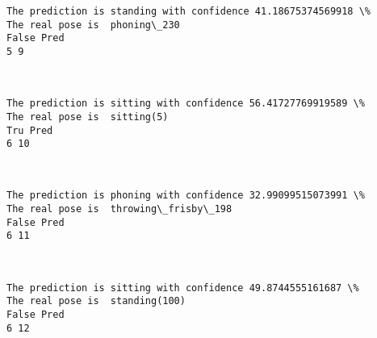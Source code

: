 \documentclass[11pt]{article}
\begin{document}
    \begin{Verbatim}[commandchars=\\\{\}]
The prediction is standing with confidence 41.18675374569918 \%
The real pose is  phoning\_230
False Pred
5 9

    \end{Verbatim}

    \begin{center}
    \end{center}
    { \hspace*{\fill} \\}
    
    \begin{Verbatim}[commandchars=\\\{\}]
The prediction is sitting with confidence 56.41727769919589 \%
The real pose is  sitting(5)
Tru Pred
6 10

    \end{Verbatim}

    \begin{center}
    \end{center}
    { \hspace*{\fill} \\}
    
    \begin{Verbatim}[commandchars=\\\{\}]
The prediction is phoning with confidence 32.99099515073991 \%
The real pose is  throwing\_frisby\_198
False Pred
6 11

    \end{Verbatim}

    \begin{center}
    \end{center}
    { \hspace*{\fill} \\}
    
    \begin{Verbatim}[commandchars=\\\{\}]
The prediction is sitting with confidence 49.8744555161687 \%
The real pose is  standing(100)
False Pred
6 12

    \end{Verbatim}

    \begin{center}
    \end{center}
    { \hspace*{\fill} \\}
    
\end{document}
